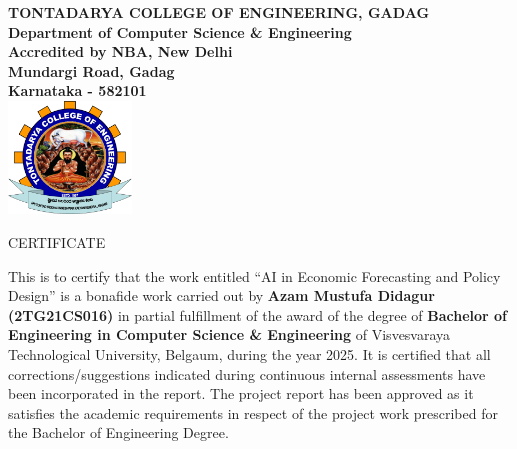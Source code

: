 \begin{center}
    \vspace*{0.5cm}
    {\large \uppercase{\textbf{Tontadarya College of Engineering, Gadag}}}\\[0.15cm]
    {\large \textbf{Department of Computer Science \& Engineering}}\\[0.15cm]
    {\large \textbf{Accredited by \uppercase{NBA}, New Delhi}}\\[0.3cm]
    {\large \textbf{Mundargi Road, Gadag}}\\[0.2cm]
    {\large \textbf{Karnataka - 582101}}\\[0.3cm]

    \includegraphics[height=3cm]{../images/tce.png}
    \vspace{0.3cm}

    {\Huge \uppercase{Certificate}}\\[0.6cm]
\end{center}

\noindent This is to certify that the work entitled ``AI in Economic Forecasting and Policy Design'' is a bonafide work carried out by \textbf{Azam Mustufa Didagur (2TG21CS016)} in partial fulfillment of the award of the degree of \textbf{Bachelor of Engineering in Computer Science \& Engineering} of Visvesvaraya Technological University, Belgaum, during the year 2025. It is certified that all corrections/suggestions indicated during continuous internal assessments have been incorporated in the report. The project report has been approved as it satisfies the academic requirements in respect of the project work prescribed for the Bachelor of Engineering Degree.

\vspace{0.6cm}

